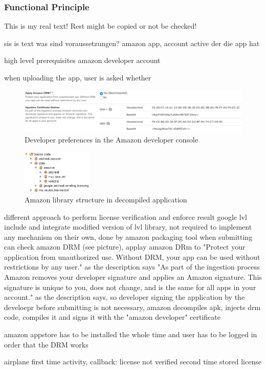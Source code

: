 \subsubsection{Functional Principle}\label{section:license-amazon-functional}
This is my real text! Rest might be copied or not be checked!

sis is text
was sind voraussetzungen? amazon app, account active der die app hat\newline

high level prerequisites
amazon developer account

when uploading the app, user is asked whether
\begin{figure}[h]
    \centering
    \includegraphics[width=1\textwidth]{data/amazon.png}
    \caption{Developer preferences in the Amazon developer console \cite{amazonDeveloper}}
    \label{fig:amazon}
\end{figure}

\begin{figure}[h]
    \centering
    \includegraphics[width=0.3\textwidth]{data/amazonFolder.png}
    \caption{Amazon library structure in decompiled application}
    \label{fig:amazonFolder}
\end{figure}

%
different approach to perform license verification and enforce result
google lvl include and integrate modified version of lvl library, not required to implement any mechanism on their own, done by amazon packaging tool
when submitting can check amazon DRM (see picture), applay amazon DRm to "Protect your application from unauthorized use. Without DRM, your app can be used without restrictions by any user." as the description says
"As part of the ingestion process Amazon removes your developer signature and applies an Amazon signature. This signature is unique to you, does not change, and is the same for all apps in your account."  as the description says, so developer signing the application by the develoepr before submitting is not necessary, amazon decompiles apk, injects drm code, compiles it and signs it with the "amazon developer" certificate
\cite{munteanLicense}
%

amazon appstore has to be installed the whole time and user has to be logged in order that the DRM works



airplane
first time
activity, callback: license not verified
second time
stored license
